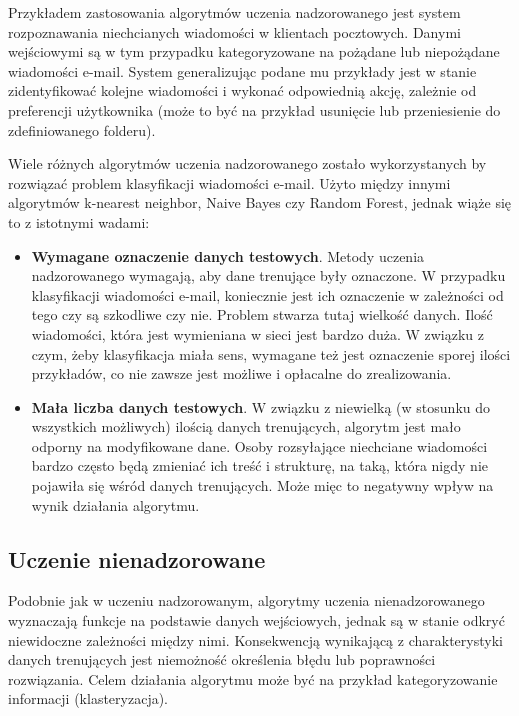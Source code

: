 Przykładem zastosowania algorytmów uczenia nadzorowanego jest system rozpoznawania niechcianych wiadomości w klientach 
pocztowych. Danymi wejściowymi są w tym przypadku kategoryzowane na pożądane lub niepożądane wiadomości e-mail.
System generalizując podane mu przykłady jest w stanie zidentyfikować kolejne wiadomości i wykonać odpowiednią akcję, 
zależnie od preferencji użytkownika (może to być na przykład usunięcie lub przeniesienie do zdefiniowanego folderu).

Wiele różnych algorytmów uczenia nadzorowanego zostało wykorzystanych by rozwiązać problem klasyfikacji wiadomości 
e-mail. Użyto między innymi algorytmów k-nearest neighbor\cite{firte2010spam}, Naive 
Bayes\cite{marsono2008binary}\cite{lakshmi2010spam} czy Random Forest\cite{koprinska2007learning}, jednak wiąże 
się to z istotnymi wadami\cite{li2014towards}:

\begin{itemize}
 \item \textbf{Wymagane oznaczenie danych testowych}. Metody uczenia nadzorowanego wymagają, aby dane trenujące były 
oznaczone. W przypadku klasyfikacji wiadomości e-mail, koniecznie jest ich oznaczenie w zależności od tego czy są 
szkodliwe czy nie. Problem stwarza tutaj wielkość danych. Ilość wiadomości, która jest wymieniana w sieci jest 
bardzo duża. W związku z czym, żeby klasyfikacja miała sens, wymagane też jest oznaczenie sporej ilości przykładów, co 
nie zawsze jest możliwe i opłacalne do zrealizowania. 
\item \textbf{Mała liczba danych testowych}. W związku z niewielką (w stosunku do wszystkich możliwych) ilością danych 
trenujących, algorytm jest mało odporny na modyfikowane dane. Osoby rozsyłające niechciane wiadomości bardzo często 
będą zmieniać ich treść i strukturę, na taką, która nigdy nie pojawiła się wśród danych trenujących. Może mięc to 
negatywny wpływ na wynik działania algorytmu.
\end{itemize}


 

\subsection{Uczenie nienadzorowane}
\label{subsec:uczenienienadzorowane}

Podobnie jak w uczeniu nadzorowanym, algorytmy uczenia nienadzorowanego wyznaczają funkcje na podstawie danych 
wejściowych, jednak są w stanie odkryć niewidoczne zależności między nimi. Konsekwencją wynikającą z charakterystyki 
danych trenujących jest niemożność określenia błędu lub poprawności rozwiązania. Celem działania algorytmu może być na 
przykład kategoryzowanie informacji (klasteryzacja).

